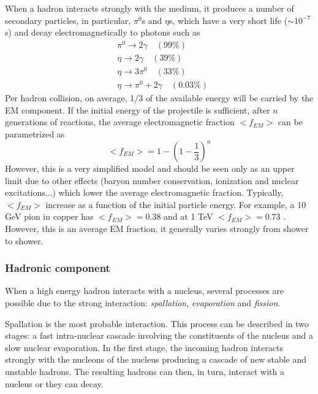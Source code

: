 When a hadron interacts strongly with the medium, it produces a number of secondary particles, in particular, $\pi^0$s and $\eta$s, which have a very short life ($\sim 10^{-7}$s) and decay electromagnetically to photons such as
\begin{equation*}
  \begin{aligned}
    &\pi^0 \rightarrow 2\gamma \quad (99\%)\\
    &\eta \rightarrow 2\gamma \quad (39\%)\\
    &\eta \rightarrow 3\pi^0 \quad (33\%)\\
    &\eta \rightarrow \pi^0 + 2\gamma \quad (0.03\%)
  \end{aligned}
\end{equation*}
Per hadron collision, on average, 1/3 of the available energy will be carried by the EM component. If the initial energy of the projectile is sufficient, after $n$ generations of reactions, the average electromagnetic fraction $<f_{EM}>$ can be parametrized as \cite{Wigmans:392793}
\begin{equation}
  <f_{EM}> = 1 - (1 - \frac{1}{3})^n
\end{equation}
However, this is a very simplified model and should be seen only as an upper limit due to other effects (baryon number conservation, ionization and nuclear excitations...) which lower the average electromagnetic fraction. Typically, $<f_{EM}>$ increase as a function of the initial particle energy. For example, a 10 GeV pion in copper has $<f_{EM}> = 0.38$ and at 1 TeV $<f_{EM}> = 0.73$ \cite{Wigmans:392793}. However, this is an average EM fraction, it generally varies strongly from shower to shower.

\subsubsection{Hadronic component}
\label{subsubsec:HadComp}

When a high energy hadron interacts with a nucleus, several processes are possible due to the strong interaction: \textit{spallation}, \textit{evaporation} and \textit{fission}.

Spallation is the most probable interaction. This process can be described in two stages: a fast intra-nuclear cascade involving the constituents of the nucleus and a slow nuclear evaporation. In the first stage, the incoming hadron interacts strongly with the nucleons of the nucleus producing a cascade of new stable and unstable hadrons. The resulting hadrons can then, in turn, interact with a nucleus or they can decay.

